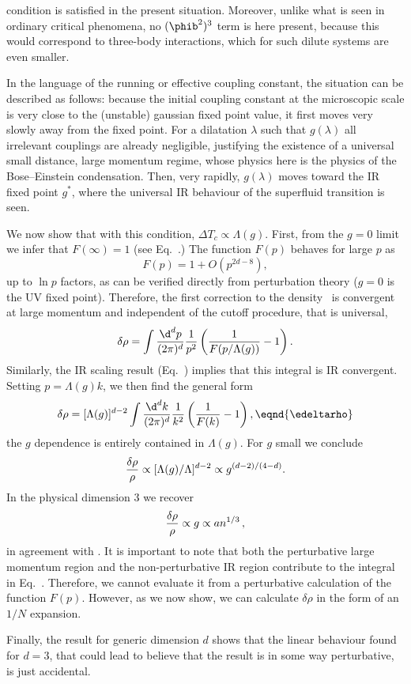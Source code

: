 condition is satisfied in the present situation. Moreover, unlike what is seen in ordinary critical phenomena, no $(\phib^2)^3$ term is here present, because this would correspond to three-body interactions, which for such dilute systems are even smaller.
\par
In the language of the running or effective coupling constant, the
situation can be described as follows: because the initial
coupling constant at the microscopic scale is very close to the (unstable) gaussian fixed point value, it first moves very slowly away from the fixed point. For a dilatation $\lambda $ such that $g(\lambda )$
all irrelevant couplings are already negligible, justifying the existence of a universal small distance, large momentum regime,
whose physics here is the physics of the Bose--Einstein condensation.
Then, very rapidly, $g(\lambda )$ moves toward the IR fixed point $g^*$, where the universal IR behaviour of the superfluid transition is seen.

We now show that with this condition, $\Delta T_c\propto \Lambda(g)$.
First, from the $g=0$ limit we infer that $F(\infty)=1$ (see Eq.~\ef.)
The function $F(p)$ behaves for large $p$ as
$$
F(p)=1+ O (p^{2d-8}),
$$
up to $\ln p$ factors, as can be verified directly from perturbation theory ($g=0$ is the UV fixed point).
Therefore, the first correction to the density \eeONrho\ is convergent at
large momentum and independent of the cutoff procedure, that is universal,
$$
\delta\rho= \int\lfrac{\d^d p}{(2\pi)^d} {1\over p^2}\left(
{1\over F(p/\Lambda(g))} -{ 1}\right).
$$
Similarly, the IR scaling result (Eq.~\eIRscaling) implies that this
integral is IR convergent.  Setting $p=\Lambda(g)k$, we then find the general
form
$$\delta\rho=[\Lambda(g)]^{d-2}\int {\d^d k \over(2\pi)^d} {1\over
k^2}\left( {1\over F(k)} - 1\right), \eqnd{\edeltarho} $$
the $g$ dependence is entirely contained in $\Lambda(g)$.  For $g$ small
we conclude
$${\displaystyle{\delta\rho\over\rho}}\propto[\Lambda (g)/\Lambda ]^{d-2}\propto
g^{(d-2)/(4-d)}. $$
In the physical dimension 3 we recover
$$
{\displaystyle{\delta\rho\over\rho}}\propto g \propto an^{1/3}\,,
$$
in agreement with .  It is important to note that both the
perturbative large momentum region and the non-perturbative IR region
contribute to the integral in Eq.~\edeltarho.  Therefore, we cannot
evaluate it from a perturbative calculation of the function $F(p)$.  However,
as we now show, we can calculate $\delta\rho$ in the form of an $1/N$ expansion.
\par
Finally, the result for generic dimension $d$ shows that the linear behaviour found for $d=3$, that could lead to believe
that the result is in some way perturbative, is just  accidental.
